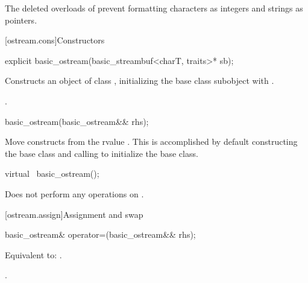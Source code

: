 \pnum
\begin{note}
The deleted overloads of 
prevent formatting characters as integers and strings as pointers.
\end{note}

[ostream.cons]{Constructors}

%
\begin{itemdecl}
explicit basic_ostream(basic_streambuf<charT, traits>* sb);
\end{itemdecl}

%
\begin{itemdescr}
\pnum
\effects
Constructs an object of class
, initializing the base class subobject with
.

\pnum
\ensures
{}.
\end{itemdescr}

%
\begin{itemdecl}
basic_ostream(basic_ostream&& rhs);
\end{itemdecl}

\begin{itemdescr}
\pnum
\effects
Move constructs from the rvalue .
This is accomplished by default constructing the base class and calling
 to initialize the
base class.
\end{itemdescr}

%
\begin{itemdecl}
virtual ~basic_ostream();
\end{itemdecl}

\begin{itemdescr}
\pnum
\remarks
Does not perform any operations on
.
\end{itemdescr}

[ostream.assign]{Assignment and swap}

%
\begin{itemdecl}
basic_ostream& operator=(basic_ostream&& rhs);
\end{itemdecl}

\begin{itemdescr}
\pnum
\effects
Equivalent to: .

\pnum
\returns
{}.
\end{itemdescr}

